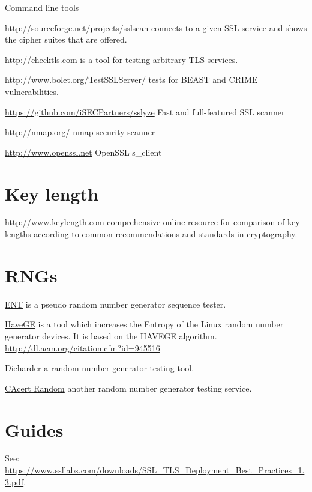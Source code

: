 Command line tools
\begin{itemize*}
  \item \url{http://sourceforge.net/projects/sslscan} connects to a given SSL service and shows the cipher suites that are offered.
  \item \url{http://checktls.com} is a tool for testing arbitrary TLS services. 
  \item \url{http://www.bolet.org/TestSSLServer/} tests for BEAST and CRIME vulnerabilities.
  \item \url{https://github.com/iSECPartners/sslyze} Fast and full-featured SSL scanner
  \item \url{http://nmap.org/} nmap security scanner
  \item \url{http://www.openssl.net} OpenSSL s\_client
\end{itemize*}


\section{Key length}
\begin{itemize*}
  \item \url{http://www.keylength.com} comprehensive online resource for comparison of key lengths according to common recommendations and standards in cryptography.
\end{itemize*}


\section{RNGs}

\begin{itemize*}
  \item \href{http://www.fourmilab.ch/random/}{ENT} is a pseudo random number generator sequence tester.
  \item \href{http://www.issihosts.com/haveged/}{HaveGE} is a tool which increases the Entropy of the Linux random number generator devices. It is based on the HAVEGE algorithm. \url{http://dl.acm.org/citation.cfm?id=945516}
  \item \href{http://www.phy.duke.edu/~rgb/General/dieharder.php}{Dieharder} a random number generator testing tool.
  \item \href{http://www.cacert.at/random/}{CAcert Random} another random number generator testing service.
\end{itemize*}

\section{Guides}
\begin{itemize*}
  \item See: \url{https://www.ssllabs.com/downloads/SSL_TLS_Deployment_Best_Practices_1.3.pdf}.
\end{itemize*}
